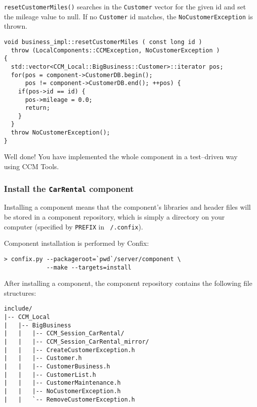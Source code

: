 {\tt resetCustomerMiles()} searches in the {\tt Customer}
vector for the given id and set the mileage value to null.
If no {\tt Customer} id matches, the {\tt NoCustomerException} is thrown.

\begin{small}
\begin{verbatim}
void business_impl::resetCustomerMiles ( const long id )
  throw (LocalComponents::CCMException, NoCustomerException )
{
  std::vector<CCM_Local::BigBusiness::Customer>::iterator pos;
  for(pos = component->CustomerDB.begin(); 
      pos != component->CustomerDB.end(); ++pos) {
    if(pos->id == id) {
      pos->mileage = 0.0;
      return;
    }
  }
  throw NoCustomerException(); 
}
\end{verbatim}
\end{small}

Well done! You have implemented the whole component in a test--driven
way using CCM Tools.



\subsubsection{Install the {\tt CarRental} component}

Installing a component means that the component's libraries and header files 
will be stored in a component repository, which is simply a directory on your 
computer (specified by {\tt PREFIX} in {\tt ~/.confix}).

Component installation is performed by Confix:
\begin{small}
\begin{verbatim}
> confix.py --packageroot=`pwd`/server/component \
            --make --targets=install
\end{verbatim}
\end{small}

\newpage
After installing a component, the component repository contains the following
file structures:
\begin{small}
\begin{verbatim}
include/
|-- CCM_Local
|   |-- BigBusiness
|   |   |-- CCM_Session_CarRental/
|   |   |-- CCM_Session_CarRental_mirror/
|   |   |-- CreateCustomerException.h
|   |   |-- Customer.h
|   |   |-- CustomerBusiness.h
|   |   |-- CustomerList.h
|   |   |-- CustomerMaintenance.h
|   |   |-- NoCustomerException.h
|   |   `-- RemoveCustomerException.h
\end{verbatim}
\end{small}

